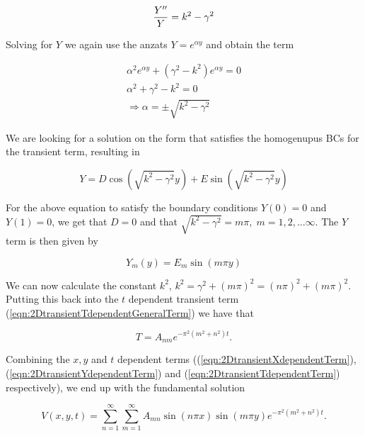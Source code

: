 \documentclass{article}
\begin{document}
\begin{subequations}
	\begin{equation}
	\frac{Y''}{Y} = k^2 - \gamma^2\\
	\end{equation}
\end{subequations}

Solving for $Y$ we again use the anzats $Y=e^{\alpha y}$ and obtain the term

\begin{subequations}
	\begin{eqnarray}
	\alpha^2 e^{\alpha y} + (\gamma^2 - k^2)e^{\alpha y} = 0 \\
	\alpha^2 + \gamma^2 - k^2 = 0 \\
	\Rightarrow \alpha = \pm \sqrt{k^2 - \gamma^2} 
	\end{eqnarray}
\end{subequations}

We are looking for a solution on the form that satisfies the homogenupus BCs for the transient term, resulting in

\begin{equation}
Y = D\cos(\sqrt{k^2 - \gamma^2}y) + E\sin(\sqrt{k^2 - \gamma^2}y)
\end{equation}

For the above equation to satisfy the boundary conditions $Y(0) = 0$ and $Y(1) = 0$, we get that $D = 0$ and that $\sqrt{k^2 - \gamma^2} = m\pi,\; m = 1,2,...\infty$. The $Y$ term is then given by

\begin{equation}
Y_m(y) = E_m\sin(m\pi y)
\label{eqn:2DtransientYdependentTerm}
\end{equation}

We can now calculate the constant $k^2$,  $k^2 = \gamma^2 + (m\pi)^2 = (n\pi)^2 + (m\pi)^2$. Putting this back into the $t$ dependent transient term (\ref{eqn:2DtransientTdependentGeneralTerm}) we have that 

\begin{equation}
T = A_{nm}e^{-\pi^2(m^2+n^2)t}.
\label{eqn:2DtransientTdependentTerm}
\end{equation}

Combining the $x,y$ and $t$ dependent terms ((\ref{eqn:2DtransientXdependentTerm}), (\ref{eqn:2DtransientYdependentTerm}) and (\ref{eqn:2DtransientTdependentTerm}) respectively), we end up with the fundamental solution

\begin{equation}
V(x,y,t) = \sum_{n=1}^{\infty} \sum_{m=1}^{\infty} A_{mn}\sin(n\pi x)\sin(m\pi y)e^{-\pi^2(m^2+n^2)t}.
\end{equation}
\end{document}
